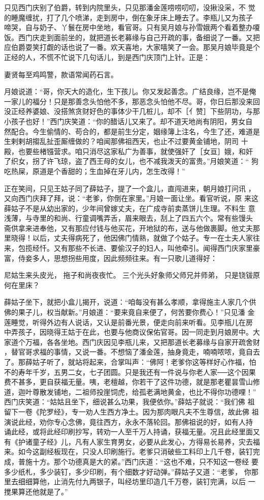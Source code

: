 只见西门庆别了伯爵，转到内院里头，只见那潘金莲唠唠叨叨，没揪没采，不
觉的睡魔缠扰，打了几个喷涕，走到房中，倒在象牙床上睡去了。李瓶儿又为孩子
啼哭，自与奶子、丫鬟在房中坐地，看官哥。只有吴月娘与孙雪娥两个看着整办嗄
饭。西门庆走到面前坐的，就把道长老募缘与自己开疏的事，备细说了一番。又把
应伯爵耍笑打觑的话也说了一番。欢天喜地，大家嘻笑了一会。那吴月娘毕竟是个
正经的人，不慌不忙说下几句话儿，到是西门庆顶门上针。正是：

妻贤每至鸡鸣警，款语常闻药石言。

月娘说道：“哥，你天大的造化，生下孩儿。你又发起善念。广结良缘，岂不是俺
一家儿的福分！只是那善念头怕他不多，那恶念头怕他不尽。哥，你日后那没来回
没正经养婆娘、没搭煞贪财好色的事体少干几桩儿，却不［亻赞］下些阴功，与那
小孩子也好！”西门庆笑道：“你的醋话儿又来了。却不道天地尚有阴阳，男女自
然配合。今生偷情的、苟合的，都是前生分定，姻缘簿上注名，今生了还，难道是
生剌剌胡搊乱扯歪厮缠做的？咱闻那佛祖西天，也止不过要黄金铺地，阴司
十殿，也要些楮镪营求。咱只消尽这家私广为善事，就使强奸了［女亘］娥，和奸
了织女，拐了许飞琼，盗了西王母的女儿，也不减我泼天的富贵。”月娘笑道：“
狗吃热屎，原道是个香甜的；生血掉在牙儿内，怎生改得！”

正在笑间，只见王姑子同了薛姑子，提了一个盒儿，直闯进来，朝月娘打问讯
，又向西门庆拜了拜，说：“老爹，你倒在家里。”月娘一面让坐。看官听说，原
来这薛姑子不是从幼出家的，少年间曾嫁丈夫，在广成寺前卖蒸饼儿生理。不料生
意浅薄，与寺里的和尚、行童调嘴弄舌，眉来眼去，刮上了四五六个。常有些馒头
斋供拿来进奉他，又有那应付钱与他买花，开地狱的布，送与他做裹脚。他丈夫那
里晓得！以后，丈夫得病死了，他因佛门情熟，就做了个姑子。专一在士夫人家往
来，包揽经忏。又有那些不长进、要偷汉子的妇人，叫他牵引。闻得西门庆家里豪
富，侍妾多人，思想拐些用度，因此频频往来。有一只歌儿道得好：

尼姑生来头皮光，
拖子和尚夜夜忙。
三个光头好象师父师兄并师弟，
只是铙钹原何在里床？

薛姑子坐下，就把小盒儿揭开，说道：“咱每没有甚么孝顺，拿得施主人家几个供
佛的果子儿，权当献新。”月娘道：“要来竟自来便了，何苦要你费心！”只见潘
金莲睡觉，听得外边有人说话，又认是前番光景，便走向前来听看。见李瓶儿在房
中弄孩子，因晓得王姑于在此，也要与他商议保佑官哥。因一同走到月娘房中。大
家道个万福，各各坐地。西门庆因见李瓶儿来，又把那道长老募缘与自家开疏舍财
，替官哥求福的事情，又说一番。不想恼了潘金莲，抽身竟走，喃喃哝哝，竟自去
了。那薛姑子听了，就站将起来，合掌叫声：“佛阿！老爹你这等样好心作福，怕
不的寿年千岁，五男二女，七子团圆。只是我还有一件说与你老人家──这个因果
费不甚多，更自获福无量。咦，老檀越，你若干了这件功德，就是那老瞿昙雪山修
道，迦叶尊散发铺地，二祖师投崖饲虎，给孤老满地黄金，也比不得你功德哩！”
西门庆笑道：“姑姑且坐下，细说甚么功果，我便依你。”薛姑子就说：“我们佛
祖留下一卷《陀罗经》，专一劝人生西方净土。因为那肉眼凡夫不生尊信，故此佛
祖演说此经，劝你专心念佛，竟往西方，永永不落轮回。那佛祖说的好，如有人持
诵此经，或将此经印刷抄写，转劝一人至千万人持诵，获福无量。况且此经里面又
有《护诸童子经》儿，凡有人家生育男女，必要从此发心，方得易长易养，灾去福
来。如今这副经板现在，只没人印刷施行。老爹只消破些工料印上几千卷，装钉完
成，普施十方。那个功德真是大的紧。”西门庆道：“这也不难，只不知这一卷经
要多少纸札，多少装钉，多少印刷，有个细数才好动弹。”薛姑子又道：“老爹，
你那里去细细算他，止消先付九两银子，叫经坊里印造几千万卷，装钉完满，以后
一搅果算还他就是了。”

